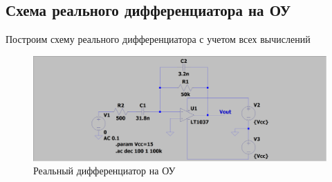 \documentclass[a4paper, 12pt]{article}
\begin{document}
    \subsection{Схема реального дифференциатора на ОУ}
    Построим схему реального дифференциатора с учетом всех вычислений
    \begin{figure}[H]
        \centering
        \includegraphics[scale=0.22]{scheme11.png}
        \captionsetup{skip=0pt}
        \caption{Реальный дифференциатор на ОУ}
        \label{fig:scheme11}
    \end{figure}
\end{document}

